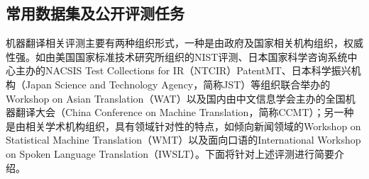 
\subsection{常用数据集及公开评测任务}

\parinterval 机器翻译相关评测主要有两种组织形式，一种是由政府及国家相关机构组织，权威性强。如由美国国家标准技术研究所组织的NIST评测、日本国家科学咨询系统中心主办的NACSIS Test Collections for IR（NTCIR）PatentMT、日本科学振兴机构（Japan Science and Technology Agency，简称JST）等组织联合举办的Workshop on Asian Translation（WAT）以及国内由中文信息学会主办的全国机器翻译大会（China Conference on Machine Translation，简称CCMT）；另一种是由相关学术机构组织，具有领域针对性的特点，如倾向新闻领域的Workshop on Statistical Machine Translation（WMT）以及面向口语的International Workshop on Spoken Language Translation（IWSLT）。下面将针对上述评测进行简要介绍。

